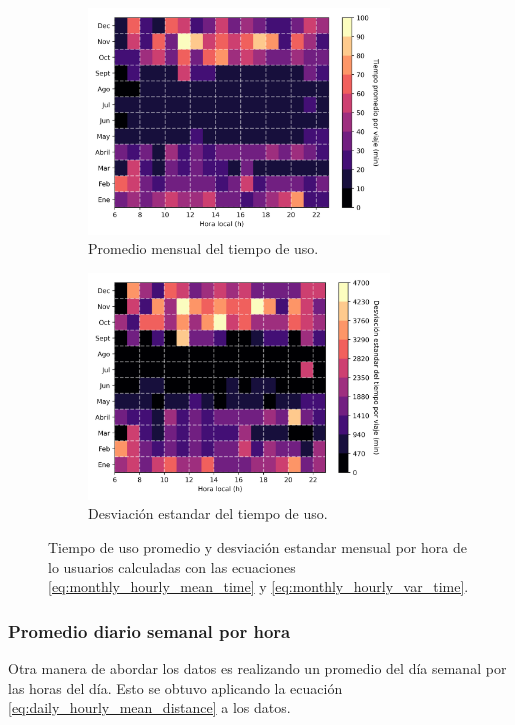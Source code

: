 \begin{figure}[H]
    \centering
    \begin{subfigure}[b]{8cm}
        \includegraphics[width=8cm]{Graphics/monthly_hourly_mean_time_travel.png}
        \caption{Promedio mensual del tiempo de uso.}
        \label{fig:monthly_hourly_mean_time}
    \end{subfigure}
    \begin{subfigure}[b]{8cm}
        \includegraphics[width=8cm]{Graphics/monthly_hourly_var_time_travel.png}
        \caption{Desviación estandar del tiempo de uso.}
        \label{fig:monthly_hourly_var_time}
    \end{subfigure}
    \caption{Tiempo de uso promedio y desviación estandar mensual por hora de lo usuarios calculadas con las ecuaciones \ref{eq:monthly_hourly_mean_time} y \ref{eq:monthly_hourly_var_time}.}
    \label{fig:monthly_hourly_time}
\end{figure}

\subsubsection{Promedio diario semanal por hora}

Otra manera de abordar los datos es realizando un promedio del día semanal por las horas del día. Esto se obtuvo aplicando la ecuación \ref{eq:daily_hourly_mean_distance} a los datos.

